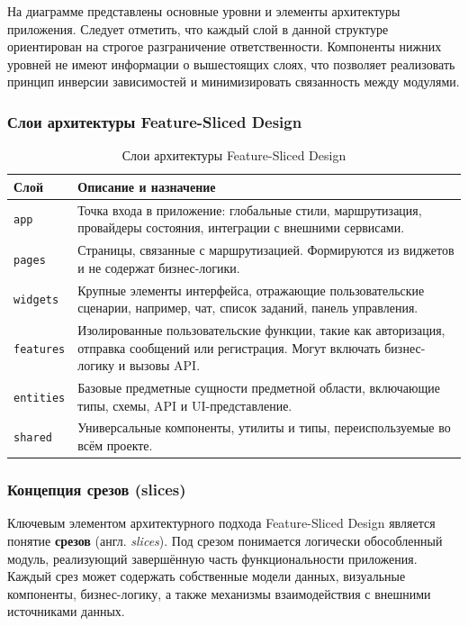 На диаграмме представлены основные уровни и элементы архитектуры приложения. Следует отметить, что каждый слой в данной структуре ориентирован на строгое разграничение ответственности. Компоненты нижних уровней не имеют информации о вышестоящих слоях, что позволяет реализовать принцип инверсии зависимостей и минимизировать связанность между модулями.

\subsubsection{Слои архитектуры Feature-Sliced Design}

\begin{table}[H]
\centering
\caption{Слои архитектуры Feature-Sliced Design}
\begin{tabular}{|p{3cm}|p{11cm}|}
\hline
\textbf{Слой} & \textbf{Описание и назначение} \\
\hline
\texttt{app} & Точка входа в приложение: глобальные стили, маршрутизация, провайдеры состояния, интеграции с внешними сервисами. \\
\hline
\texttt{pages} & Страницы, связанные с маршрутизацией. Формируются из виджетов и не содержат бизнес-логики. \\
\hline
\texttt{widgets} & Крупные элементы интерфейса, отражающие пользовательские сценарии, например, чат, список заданий, панель управления. \\
\hline
\texttt{features} & Изолированные пользовательские функции, такие как авторизация, отправка сообщений или регистрация. Могут включать бизнес-логику и вызовы API. \\
\hline
\texttt{entities} & Базовые предметные сущности предметной области, включающие типы, схемы, API и UI-представление. \\
\hline
\texttt{shared} & Универсальные компоненты, утилиты и типы, переиспользуемые во всём проекте. \\
\hline
\end{tabular}
\end{table}

\subsubsection{Концепция срезов (slices)}

Ключевым элементом архитектурного подхода Feature-Sliced Design является понятие \textbf{срезов} (англ. \textit{slices}). Под срезом понимается логически обособленный модуль, реализующий завершённую часть функциональности приложения. Каждый срез может содержать собственные модели данных, визуальные компоненты, бизнес-логику, а также механизмы взаимодействия с внешними источниками данных.

